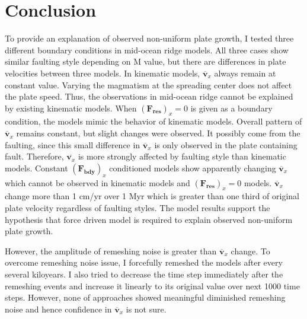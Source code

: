 \documentclass[letterpaper,12pt,notitle]{memphisthesis}                     %
\begin{document}
\chapter{Conclusion}

To provide an explanation of observed non-uniform plate growth, I tested three different boundary conditions in mid-ocean ridge models. All three cases show similar faulting style depending on M value, but there are differences in plate velocities between three models. In kinematic models, $\overline{\boldsymbol{v}}_{x}$ always remain at constant value. Varying the magmatism at the spreading center does not affect the plate speed. Thus, the observations in mid-ocean ridge cannot be explained by existing kinematic models. When $(\boldsymbol{F_{res}})_x = 0$ is given as a boundary condition, the models mimic the behavior of kinematic models. Overall pattern of $\overline{\boldsymbol{v}}_{x}$ remains constant, but slight changes were observed. It possibly come from the faulting, since this small difference in $\overline{\boldsymbol{v}}_{x}$ is only observed in the plate containing fault. Therefore, $\overline{\boldsymbol{v}_{x}}$ is more strongly affected by faulting style than kinematic models. Constant $(\boldsymbol{F_{bdy}})_x$ conditioned models show apparently changing $\overline{\boldsymbol{v}}_{x}$ which cannot be observed in kinematic models and $(\boldsymbol{F_{res}})_x = 0$ models. $\overline{\boldsymbol{v}}_{x}$ change more than 1 cm/yr over 1 Myr which is greater than one third of original plate velocity regardless of faulting styles. The model results support the hypothesis that force driven model is required to explain observed non-uniform plate growth.

However, the amplitude of remeshing noise is greater than $\overline{\boldsymbol{v}}_{x}$ change. To overcome remeshing noise issue, I forcefully remeshed the models after every several kiloyears. I also tried to decrease the time step immediately after the remeshing events and increase it linearly to its original value over next 1000 time steps. However, none of approaches showed meaningful diminished remeshing noise and hence confidence in $\overline{\boldsymbol{v}}_{x}$ is not sure.

\end{document}
